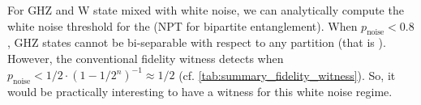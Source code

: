 \documentclass[
reprint,
aps,
pra,
floatfix,
]{revtex4-2}
\theoremstyle{plain}
\newtheorem{proposition}{Proposition}
\theoremstyle{definition}
\newcommand{\ew}{W}
\newcommand{\dm}{\rho}
\newcommand{\noise}{\text{noise}}
\begin{document}

For GHZ and W state mixed with white noise, we can analytically compute the white noise threshold for the  (NPT for bipartite entanglement).
When $p_{\noise}<0.8$, GHZ states cannot be bi-separable with respect to any partition (that is ).
However, the conventional fidelity witness detects  when $p_{\noise}<1/2 \cdot (1-1/2^n)^{-1}\approx 1/2$ (cf. \cref{tab:summary_fidelity_witness}).
So, it would be practically interesting to have a witness for this white noise regime.
\end{document}
